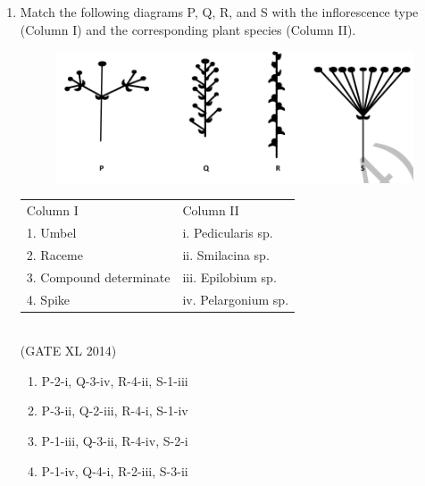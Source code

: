 \documentclass[journal,12pt,onecolumn]{IEEEtran}
\theoremstyle{remark}
\begin{document}
\begin{enumerate}
    \item Match the following diagrams P, Q, R, and S with the inflorescence type (Column I) and the corresponding plant species (Column II).  
    \begin{figure}[H]
        \centering
        \includegraphics[width=0.5\columnwidth]{fig33.png}
        \caption{}
        \label{fig:placeholder}
    \end{figure}

    \begin{tabular}{ll}
    Column I & Column II \\
    1. Umbel & i. Pedicularis sp. \\
    2. Raceme & ii. Smilacina sp. \\
    3. Compound determinate & iii. Epilobium sp. \\
    4. Spike & iv. Pelargonium sp. \\
    \end{tabular}\\
    \hfill (GATE XL 2014)
    \begin{multicols}{2}
    \begin{enumerate}
        \item P-2-i, Q-3-iv, R-4-ii, S-1-iii  
        \item P-3-ii, Q-2-iii, R-4-i, S-1-iv  
        \item P-1-iii, Q-3-ii, R-4-iv, S-2-i  
        \item P-1-iv, Q-4-i, R-2-iii, S-3-ii  
    \end{enumerate}
    \end{multicols}



\end{enumerate}
\end{document}
